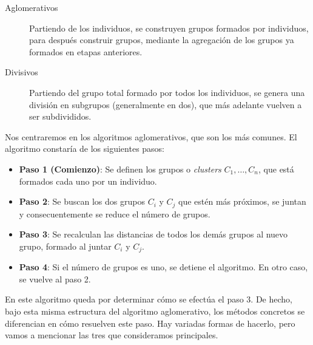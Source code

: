 \documentclass[
  a4paper,
  oneside]{scrbook}
\theoremstyle{definition}
\theoremstyle{definition}
\theoremstyle{definition}
\theoremstyle{definition}
\theoremstyle{remark}
\begin{document}
\begin{description}
\item[Aglomerativos]
Partiendo de los individuos, se construyen grupos formados por
individuos, para después construir grupos, mediante la agregación de
los grupos ya formados en etapas anteriores.
\item[Divisivos]
Partiendo del grupo total formado por todos los individuos, se
genera una división en subgrupos (generalmente en dos), que más
adelante vuelven a ser subdivididos.
\end{description}

Nos centraremos en los algoritmos aglomerativos, que son los más
comunes. El algoritmo constaría de los siguientes pasos:

\begin{itemize}
\item
  \textbf{Paso 1 (Comienzo)}: Se definen los grupos o \emph{clusters}
  \(C_1,\ldots,C_n\), que está formados cada uno por un individuo.
\item
  \textbf{Paso 2}: Se buscan los dos grupos \(C_i\) y \(C_j\) que estén más
  próximos, se juntan y consecuentemente se reduce el número de
  grupos.
\item
  \textbf{Paso 3}: Se recalculan las distancias de todos los demás grupos al
  nuevo grupo, formado al juntar \(C_i\) y \(C_j\).
\item
  \textbf{Paso 4}: Si el número de grupos es uno, se detiene el algoritmo. En
  otro caso, se vuelve al paso 2.
\end{itemize}

En este algoritmo queda por determinar cómo se efectúa el paso 3. De
hecho, bajo esta misma estructura del algoritmo aglomerativo, los
métodos concretos se diferencian en cómo resuelven este paso. Hay
variadas formas de hacerlo, pero vamos a mencionar las tres que
consideramos principales.
\end{document}
